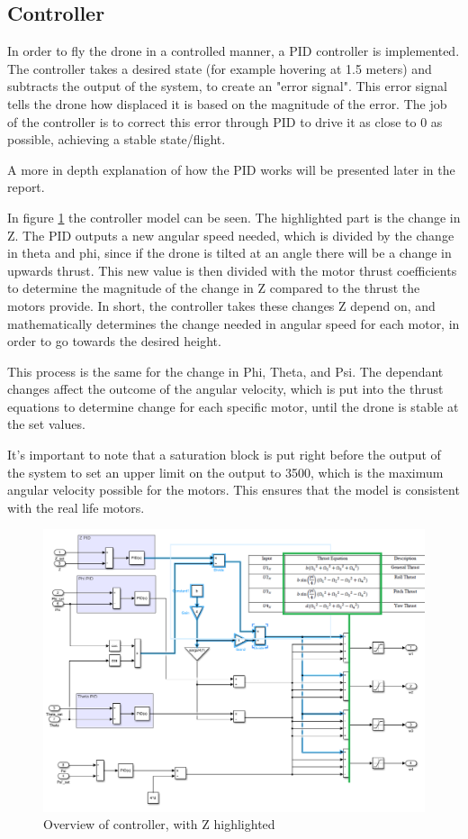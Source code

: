 \subsection{Controller}\label{linear}
In order to fly the drone in a controlled manner, a PID controller is implemented.
The controller takes a desired state (for example hovering at 1.5 meters) and subtracts the output of the system, to create an "error signal".
This error signal tells the drone how displaced it is based on the magnitude of the error. The job of the controller is to correct this error through PID to drive it as close to 0 as possible, achieving a stable state/flight.

A more in depth explanation of how the PID works will be presented later in the report. 

In figure \ref{fig:controlleroverview} the controller model can be seen. The highlighted part is the change in Z. The PID outputs a new angular speed needed, which is divided by the change in theta and phi, since if the drone is tilted at an angle there will be a change in upwards thrust. This new value is then divided with the motor thrust coefficients to determine the magnitude of the change in Z compared to the thrust the motors provide. In short, the controller takes these changes Z depend on, and mathematically determines the change needed in angular speed for each motor, in order to go towards the desired height. \cite{Ferry}

This process is the same for the change in Phi, Theta, and Psi. The dependant changes affect the outcome of the angular velocity, which is put into the thrust equations to determine change for each specific motor, until the drone is stable at the set values.

It's important to note that a saturation block is put right before the output of the system to set an upper limit on the output to 3500, which is the maximum angular velocity possible for the motors. This ensures that the model is consistent with the real life motors.

\begin{figure}[H]
\begin{center}
   \includegraphics[scale =0.6]{pictures/control/Controller.png}
\end{center}
\caption{Overview of controller, with Z highlighted}
\label{fig:controlleroverview}
\end{figure}